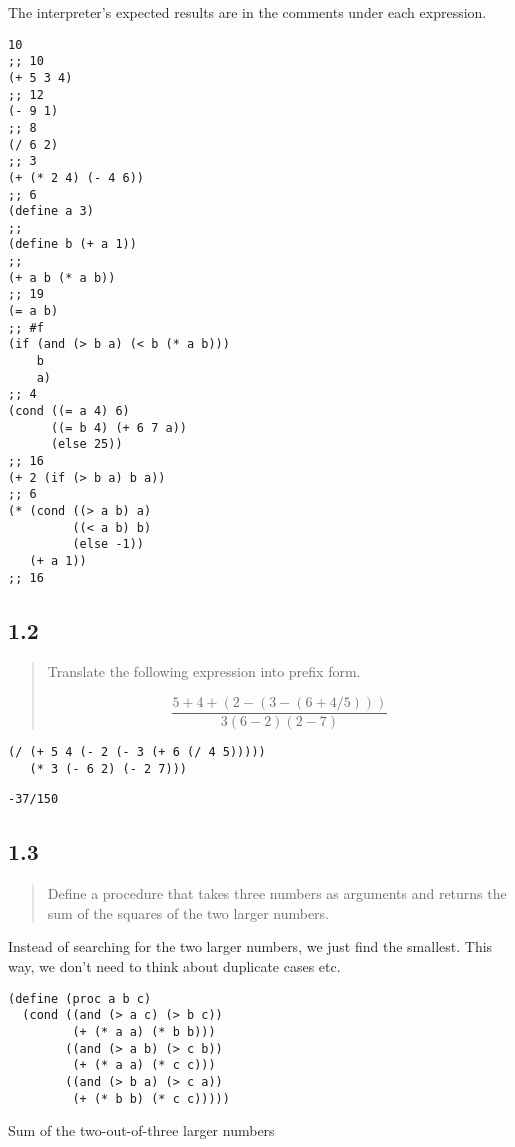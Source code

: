 \documentclass[a4paper, titlepage, twoside]{article}
\begin{document}
The interpreter's expected results are in the comments under each expression.

\begin{verbatim}
10
;; 10
(+ 5 3 4)
;; 12
(- 9 1)
;; 8
(/ 6 2)
;; 3
(+ (* 2 4) (- 4 6))
;; 6
(define a 3)
;;
(define b (+ a 1))
;;
(+ a b (* a b))
;; 19
(= a b)
;; #f
(if (and (> b a) (< b (* a b)))
    b
    a)
;; 4
(cond ((= a 4) 6)
      ((= b 4) (+ 6 7 a))
      (else 25))
;; 16
(+ 2 (if (> b a) b a))
;; 6
(* (cond ((> a b) a)
         ((< a b) b)
         (else -1))
   (+ a 1))
;; 16
\end{verbatim}

\subsection*{1.2}
\label{sec:orgfa9a1e0}

\begin{quote}
Translate the following expression into prefix form.

\begin{equation}
\label{eq:1}
\frac{5+4+(2 - (3 - (6 + 4/5)))}{3(6-2)(2-7)}
\end{equation}
\end{quote}

\begin{verbatim}
(/ (+ 5 4 (- 2 (- 3 (+ 6 (/ 4 5)))))
   (* 3 (- 6 2) (- 2 7)))
\end{verbatim}

\begin{verbatim}
-37/150
\end{verbatim}

\subsection*{1.3}
\label{sec:org5fe782d}

\begin{quote}
Define a procedure that takes three numbers as arguments and returns the sum of the squares of the two larger numbers.
\end{quote}

Instead of searching for the two larger numbers, we just find the smallest. This way, we don't need to think about duplicate cases etc.

\begin{listing}[htbp]
\begin{verbatim}
(define (proc a b c)
  (cond ((and (> a c) (> b c))
         (+ (* a a) (* b b)))
        ((and (> a b) (> c b))
         (+ (* a a) (* c c)))
        ((and (> b a) (> c a))
         (+ (* b b) (* c c)))))
\end{verbatim}
\caption{\label{lst:org6fa51c8}Sum of the two-out-of-three larger numbers}
\end{listing}
\end{document}
